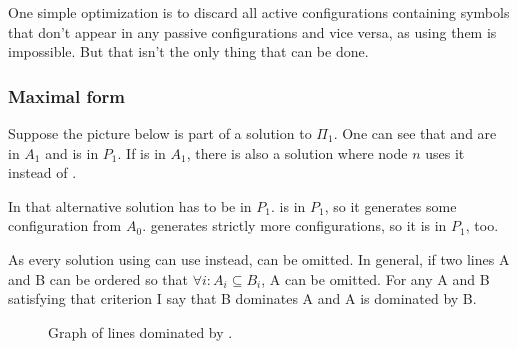\documentclass[english, 12pt, a4paper, sci, utf8, a-1b, online]{aaltothesis}
\begin{document}
One simple optimization is to discard all active configurations containing symbols that don't appear in any passive configurations and vice versa, as using them is impossible. But that isn't the only thing that can be done.

\subsubsection{Maximal form}

Suppose the picture below is part of a solution to $\Pi_{1}$. One can see that  and  are in $A_{1}$ and  is in $P_{1}$. If  is in $A_{1}$, there is also a solution where node $n$ uses it instead of .


In that alternative solution  has to be in $P_{1}$.  is in $P_{1}$, so it generates some configuration from $A_{0}$.  generates strictly more configurations, so it is in $P_{1}$, too.

As every solution using  can use  instead,  can be omitted. In general, if two lines A and B can be ordered so that $\forall i : A_i \subseteq B_i$, A can be omitted.\cite{DA2020} For any A and B satisfying that criterion I say that B dominates A and A is dominated by B.

\begin{figure}[h]
  \centering
  \caption{Graph of lines dominated by .}
\end{figure}
\end{document}
